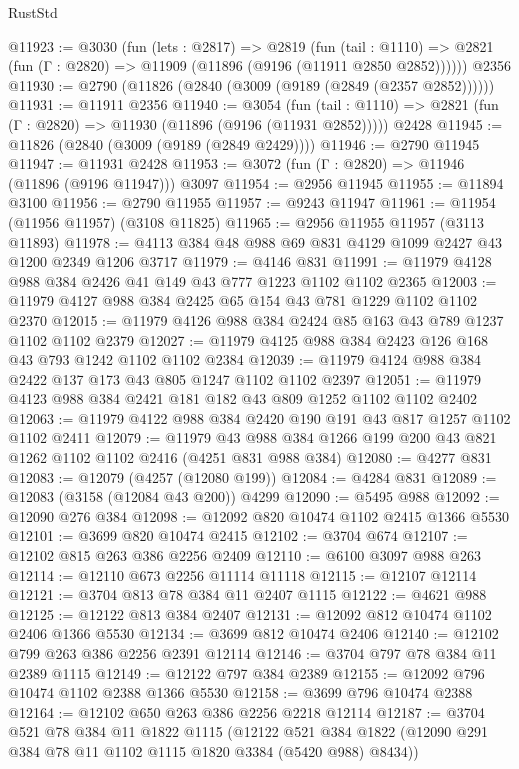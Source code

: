 \begin{lexlean}{RustStd}
\begin{coremodule}
{\begin{coremodule}
{{{{{{{{{{{{{{{{{{{{{{{{{{@11923 := @3030
    (fun (lets : @2817) =>
    @2819
      (fun (tail : @1110) =>
      @2821 (fun (Γ : @2820) => @11909 (@11896 (@9196 (@11911 @2850 @2852))))))
    @2356
@11930 := @2790 (@11826 (@2840 (@3009 (@9189 (@2849 (@2357 @2852))))))
@11931 := @11911 @2356
@11940 := @3054
    (fun (tail : @1110) => @2821 (fun (Γ : @2820) => @11930 (@11896 (@9196 (@11931 @2852)))))
    @2428
@11945 := @11826 (@2840 (@3009 (@9189 (@2849 @2429))))
@11946 := @2790 @11945
@11947 := @11931 @2428
@11953 := @3072 (fun (Γ : @2820) => @11946 (@11896 (@9196 @11947))) @3097
@11954 := @2956 @11945
@11955 := @11894 @3100
@11956 := @2790 @11955
@11957 := @9243 @11947
@11961 := @11954 (@11956 @11957) (@3108 @11825)
@11965 := @2956 @11955 @11957 (@3113 @11893)
@11978 := @4113 @384 @48 @988 @69 @831 @4129 @1099 @2427 @43 @1200 @2349 @1206 @3717
@11979 := @4146 @831
@11991 := @11979 @4128 @988 @384 @2426 @41 @149 @43 @777 @1223 @1102 @1102 @2365
@12003 := @11979 @4127 @988 @384 @2425 @65 @154 @43 @781 @1229 @1102 @1102 @2370
@12015 := @11979 @4126 @988 @384 @2424 @85 @163 @43 @789 @1237 @1102 @1102 @2379
@12027 := @11979 @4125 @988 @384 @2423 @126 @168 @43 @793 @1242 @1102 @1102 @2384
@12039 := @11979 @4124 @988 @384 @2422 @137 @173 @43 @805 @1247 @1102 @1102 @2397
@12051 := @11979 @4123 @988 @384 @2421 @181 @182 @43 @809 @1252 @1102 @1102 @2402
@12063 := @11979 @4122 @988 @384 @2420 @190 @191 @43 @817 @1257 @1102 @1102 @2411
@12079 := @11979
    @43
    @988
    @384
    @1266
    @199
    @200
    @43
    @821
    @1262
    @1102
    @1102
    @2416
    (@4251 @831 @988 @384)
@12080 := @4277 @831
@12083 := @12079 (@4257 (@12080 @199))
@12084 := @4284 @831
@12089 := @12083 (@3158 (@12084 @43 @200)) @4299
@12090 := @5495 @988
@12092 := @12090 @276 @384
@12098 := @12092 @820 @10474 @1102 @2415 @1366 @5530
@12101 := @3699 @820 @10474 @2415
@12102 := @3704 @674
@12107 := @12102 @815 @263 @386 @2256 @2409
@12110 := @6100 @3097 @988 @263
@12114 := @12110 @673 @2256 @11114 @11118
@12115 := @12107 @12114
@12121 := @3704 @813 @78 @384 @11 @2407 @1115
@12122 := @4621 @988
@12125 := @12122 @813 @384 @2407
@12131 := @12092 @812 @10474 @1102 @2406 @1366 @5530
@12134 := @3699 @812 @10474 @2406
@12140 := @12102 @799 @263 @386 @2256 @2391 @12114
@12146 := @3704 @797 @78 @384 @11 @2389 @1115
@12149 := @12122 @797 @384 @2389
@12155 := @12092 @796 @10474 @1102 @2388 @1366 @5530
@12158 := @3699 @796 @10474 @2388
@12164 := @12102 @650 @263 @386 @2256 @2218 @12114
@12187 := @3704
    @521
    @78
    @384
    @11
    @1822
    @1115
    (@12122 @521 @384 @1822 (@12090 @291 @384 @78 @11 @1102 @1115 @1820 @3384 (@5420 @988) @8434))
}}}}}}}}}}}}}}}}}}}}}}}}}}
\end{coremodule}}
\end{coremodule}
\end{lexlean}
